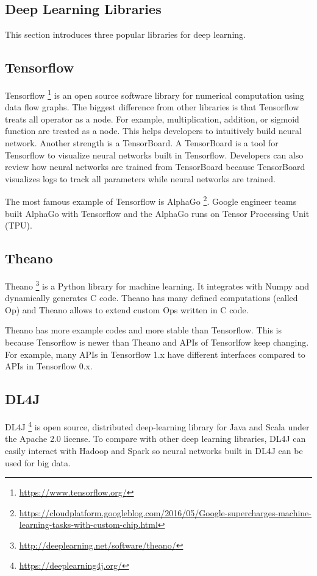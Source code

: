 \documentclass[draft,dvipsnames]{drexel-thesis}
\begin{document}
\begin{thesis}
\section{Deep Learning Libraries}\label{sec:DLL}
This section introduces three popular libraries for deep learning.

\subsection{Tensorflow}
Tensorflow \footnote{\url{https://www.tensorflow.org/}} is an open source software library for numerical computation using data flow graphs. The biggest difference from other libraries is that Tensorflow treats all operator as a node. For example, multiplication, addition, or sigmoid function are treated as a node.  This helps developers to intuitively build neural network. Another strength is a TensorBoard. A TensorBoard is a tool for Tensorflow to visualize neural networks built in Tensorflow. Developers can also review how neural networks are trained from TensorBoard because TensorBoard visualizes logs to track all parameters while neural networks are trained.

The most famous example of Tensorflow is AlphaGo \footnote{\url{https://cloudplatform.googleblog.com/2016/05/Google-supercharges-machine-learning-tasks-with-custom-chip.html}}. Google engineer teams built AlphaGo with Tensorflow and the AlphaGo runs on Tensor Processing Unit (TPU).


\subsection{Theano}
Theano \footnote{\url{http://deeplearning.net/software/theano/}} is a Python library for machine learning. It integrates with Numpy and dynamically generates C code. Theano has many defined computations (called Op) and Theano allows to extend custom Ops written in C code.

Theano has more example codes and more stable than Tensorflow. This is because Tensorflow is newer than Theano and APIs of Tensorlfow keep changing. For example, many APIs in Tensorflow 1.x have different interfaces compared to APIs in Tensorflow 0.x.


\subsection{DL4J}
DL4J \footnote{\url{https://deeplearning4j.org/}} is open source, distributed deep-learning library for Java and Scala under the Apache 2.0 license. To compare with other deep learning libraries, DL4J can easily interact with Hadoop and Spark so neural networks built in DL4J can be used for big data.



\end{thesis}
\end{document}
